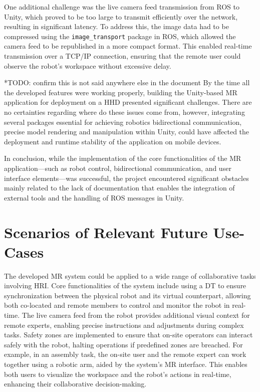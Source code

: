 One additional challenge was the live camera feed transmission from \ac{ROS} to Unity, which proved to be too large to transmit efficiently over the network, resulting in significant latency. To address this, the image data had to be compressed using the \texttt{image\_transport} package in \ac{ROS}, which allowed the camera feed to be republished in a more compact format. This enabled real-time transmission over a \ac{TCP}/\ac{IP} connection, ensuring that the remote user could observe the robot’s workspace without excessive delay.

*TODO: confirm this is not said anywhere else in the document
By the time all the developed features were working properly, building the Unity-based \ac{MR} application for deployment on a \ac{HHD} presented significant challenges. There are no certainties regarding where do these issues come from, however, integrating several packages essential for achieving robotics bidirectional communication, precise model rendering and manipulation within Unity, could have affected the deployment and runtime stability of the application on mobile devices.

In conclusion, while the implementation of the core functionalities of the \ac{MR} application—such as robot control, bidirectional communication, and user interface elements—was successful, the project encountered significant obstacles mainly related to the lack of documentation that enables the integration of external tools and the handling of \ac{ROS} messages in Unity.



\section{Scenarios of Relevant Future Use-Cases}

The developed \ac{MR} system could be applied to a wide range of collaborative tasks involving \ac{HRI}. Core functionalities of the system include using a \ac{DT} to ensure synchronization between the physical robot and its virtual counterpart, allowing both co-located and remote members to control and monitor the robot in real-time. The live camera feed from the robot provides additional visual context for remote experts, enabling precise instructions and adjustments during complex tasks. Safety zones are implemented to ensure that on-site operators can interact safely with the robot, halting operations if predefined zones are breached. For example, in an assembly task, the on-site user and the remote expert can work together using a robotic arm, aided by the system’s \ac{MR} interface. This enables both users to visualize the workspace and the robot’s actions in real-time, enhancing their collaborative decision-making. 

